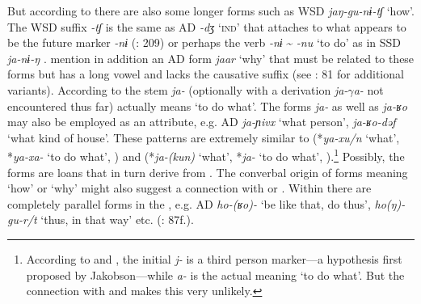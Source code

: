 But according to \citet[206]{ShiraishiTangiku2013} there are also some longer forms such as WSD \textit{jaŋ-gu-nɨ-tʃ} ‘how’. The WSD suffix \textit{-tʃ} is the same as AD \textit{-dʒ} ‘\textsc{ind}’ that attaches to what appears to be the future marker \textit{-nɨ} (\citealt{NedjalkovOtaina2013}: 209) or perhaps the verb \textit{-nɨ} {\textasciitilde} \textit{-nu} ‘to do’ as in SSD \textit{ja-nɨ-ŋ} \citep[81]{Fortescue2016}. \citet[369]{NedjalkovOtaina2013} mention in addition an AD form \textit{jaar} ‘why’ that must be related to these forms but has a long vowel and lacks the causative suffix (see \citealt{Fortescue2016}: 81 for additional variants). According to \citet[238]{Mattissen2003} the stem \textit{ja-} (optionally with a derivation \textit{ja-$\gamma $a-} not encountered thus far) actually means ‘to do what’. The forms \textit{ja-} as well as \textit{ja-ʁo} may also be employed as an attribute, e.g. AD \textit{ja-ɲivx} ‘what person’, \textit{ja-ʁo-dəf} ‘what kind of house’. These patterns are extremely similar to  (*\textit{ya-}\textit{xu/n} ‘what’, *\textit{ya-}\textit{xa-} ‘to do what’, ) and  (*\textit{ja-(kun)} ‘what’, *\textit{ja-} ‘to do what’, ).\footnote{According to \citet[209]{NedjalkovOtaina2013} and \citet[81]{Fortescue2016}, the initial \textit{j-} is a third person  marker---a hypothesis first proposed by Jakobson---while \textit{a-} is the actual  meaning ‘to do what’. But the connection with  and  makes this very unlikely.} Possibly, the  forms are  loans that in turn derive from . The converbal origin of forms meaning ‘how’ or ‘why’ might also suggest a connection with  or . Within  there are completely parallel forms in the , e.g. AD \textit{ho-(ʁo)-} ‘be like that, do thus’, \textit{ho(ŋ)-gu-r/t} ‘thus, in that way’ etc. (\citealt{NedjalkovOtaina2013}: 87f.).


